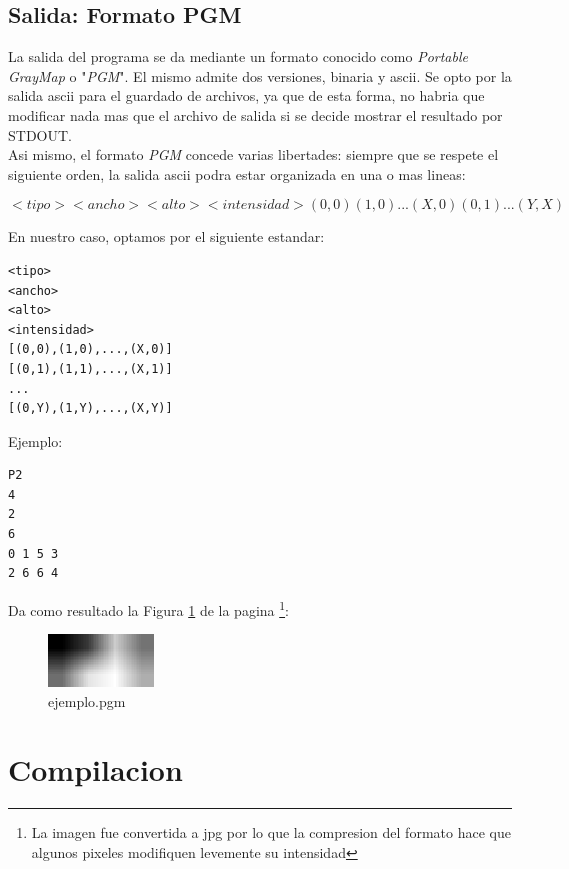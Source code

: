 \documentclass[10pt,spanish,a4paper,openany,notitlepage]{article}
\begin{document}
\subsection{Salida: Formato PGM}

La salida del programa se da mediante un formato conocido como \textit{Portable GrayMap} o "\textit{PGM}". El mismo admite dos versiones, binaria y ascii. Se opto por la salida ascii para el guardado de archivos, ya que de esta
forma, no habria que modificar nada mas que el archivo de salida si se decide mostrar el resultado por STDOUT.\\
Asi mismo, el formato \textit{PGM} concede varias libertades: siempre que se respete el siguiente orden, la salida ascii podra estar organizada en una o mas lineas:

\[ <tipo> <ancho> <alto> <intensidad> (0,0) (1,0) ... (X,0) (0,1) ... (Y,X)  \] 

En nuestro caso, optamos por el siguiente estandar:

\begin{framed}
\begin{verbatim}<tipo>
<ancho>
<alto>
<intensidad>
[(0,0),(1,0),...,(X,0)]
[(0,1),(1,1),...,(X,1)]
...
[(0,Y),(1,Y),...,(X,Y)]\end{verbatim}
\end{framed}


Ejemplo:
\begin{framed}
\begin{verbatim}P2
4
2
6
0 1 5 3
2 6 6 4\end{verbatim}
\end{framed}

Da como resultado la Figura \ref{ej} de la pagina \pageref{ej}\footnote{La imagen fue convertida a jpg por lo que la compresion del formato hace que algunos pixeles modifiquen levemente su intensidad}:

\begin{figure}[hbt]
\centering
\includegraphics[width=0.25\textwidth]{asd.jpg}
\caption{ejemplo.pgm}
\label{ej}
\end{figure}

\section{Compilacion}
\end{document}
